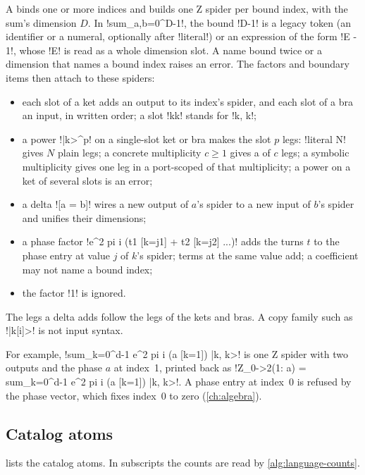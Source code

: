A  binds one or more indices and builds one Z spider per bound index, with the sum's dimension $D$. In \code!sum_{a,b=0}^{D-1}!, the bound \code!D-1! is a legacy token (an identifier or a numeral, optionally after \code!literal!) or an expression of the form \code!E - 1!, whose \code!E! is read as a whole dimension slot. A name bound twice or a dimension that names a bound index raises an error. The factors and boundary items then attach to these spiders:
\begin{itemize}
\item each slot of a ket adds an output to its index's spider, and each slot of a bra an input, in written order; a slot \code!kk! stands for \code!k, k!;
\item a power \code!|k>^{p}! on a single-slot ket or bra makes the slot $p$ legs: \code!literal N! gives $N$ plain legs; a concrete multiplicity $c\ge1$ gives a  of $c$ legs; a symbolic multiplicity gives one leg in a port-scoped \bbox{} of that multiplicity; a power on a ket of several slots is an error;
\item a delta \code![a = b]! wires a new output of $a$'s spider to a new input of $b$'s spider and unifies their dimensions;
\item a phase factor \code!e^{2 pi i (t1 [k=j1] + t2 [k=j2] ...)}! adds the turns $t$ to the phase entry at value $j$ of $k$'s spider; terms at the same value add; a coefficient may not name a bound index;
\item the factor \code!1! is ignored.
\end{itemize}
The legs a delta adds follow the legs of the kets and bras. A copy family such as \code!|k[i]>! is not input syntax.

For example, \code!sum_{k=0}^{d-1} e^{2 pi i (a [k=1])} |k, k>! is one Z spider with two outputs and the phase $a$ at index~1, printed back as \code!Z_{0->2}(1: a) = sum_{k=0}^{d-1} e^{2 pi i (a [k=1])} |k, k>!. A phase entry at index~$0$ is refused by the phase vector, which fixes index~$0$ to zero (\cref{ch:algebra}).

\subsection{Catalog atoms}\label{sec:language-dirac-atoms}

 lists the catalog atoms. In subscripts the counts are read by \cref{alg:language-counts}.

